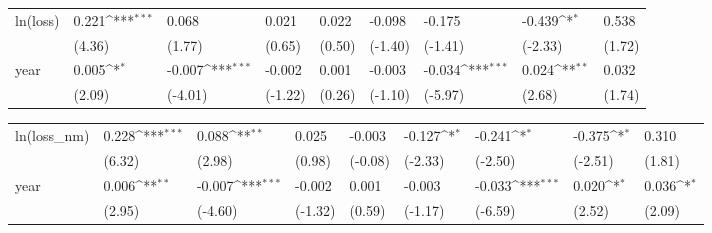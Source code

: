 \def\sym#1{\ifmmode^{#1}\else\(^{#1}\)\fi}
\begin{tabular}{p{1.5cm} p{2cm} p{1.7cm} p{1.7cm} p{1.7cm} p{1.7cm} p{1.7cm} p{1.7cm} p{1.7cm}}
\hline
ln(loss)        &    0.221\sym{***}&    0.068         &    0.021         &    0.022         &   -0.098         &   -0.175         &   -0.439\sym{*}  &    0.538         \\
                &   (4.36)         &   (1.77)         &   (0.65)         &   (0.50)         &  (-1.40)         &  (-1.41)         &  (-2.33)         &   (1.72)         \\
year            &    0.005\sym{*}  &   -0.007\sym{***}&   -0.002         &    0.001         &   -0.003         &   -0.034\sym{***}&    0.024\sym{**} &    0.032         \\
                &   (2.09)         &  (-4.01)         &  (-1.22)         &   (0.26)         &  (-1.10)         &  (-5.97)         &   (2.68)         &   (1.74)         \\
\end{tabular}
\def\sym#1{\ifmmode^{#1}\else\(^{#1}\)\fi}
\begin{tabular}{p{1.5cm} p{2cm} p{1.7cm} p{1.7cm} p{1.7cm} p{1.7cm} p{1.7cm} p{1.7cm} p{1.7cm}}
\hline
ln(loss\_nm)     &    0.228\sym{***}&    0.088\sym{**} &    0.025         &   -0.003         &   -0.127\sym{*}  &   -0.241\sym{*}  &   -0.375\sym{*}  &    0.310         \\
                &   (6.32)         &   (2.98)         &   (0.98)         &  (-0.08)         &  (-2.33)         &  (-2.50)         &  (-2.51)         &   (1.81)         \\
year            &    0.006\sym{**} &   -0.007\sym{***}&   -0.002         &    0.001         &   -0.003         &   -0.033\sym{***}&    0.020\sym{*}  &    0.036\sym{*}  \\
                &   (2.95)         &  (-4.60)         &  (-1.32)         &   (0.59)         &  (-1.17)         &  (-6.59)         &   (2.52)         &   (2.09)         \\
\end{tabular}
